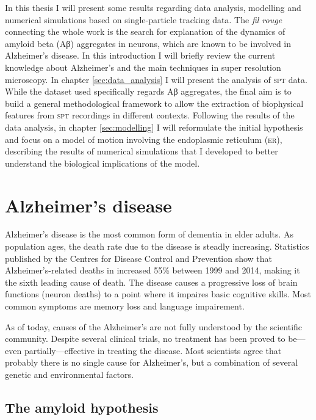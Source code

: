 In this thesis I will present some results regarding data analysis, modelling and numerical simulations based on single-particle tracking data. The \textit{fil rouge} connecting the whole work is the search for explanation of the dynamics of amyloid beta (Aβ) aggregates in neurons, which are known to be involved in Alzheimer's disease. In this introduction I will briefly review the current knowledge about Alzheimer's and the main techniques in super resolution microscopy. In chapter \ref{sec:data_analysis} I will present the analysis of \textsc{spt} data. While the dataset used specifically regards Aβ aggregates, the final aim is to build a general methodological framework to allow the extraction of biophysical features from \textsc{spt} recordings in different contexts. Following the results of the data analysis, in chapter \ref{sec:modelling} I will reformulate the initial hypothesis and focus on a model of motion involving the endoplasmic reticulum (\textsc{er}), describing the results of numerical simulations that I developed to better understand the biological implications of the model.

\section{Alzheimer's disease}\label{sec:alzheimer}

Alzheimer’s disease is the most common form of dementia in elder adults. As population ages, the death rate due to the disease is steadly increasing. Statistics published by the Centres for Disease Control and Prevention show that Alzheimer’s-related deaths in  increased 55\% between 1999 and 2014, making it the sixth leading cause of death. The disease causes a progressive loss of brain functions (neuron deaths) to a point where it impaires basic cognitive skills. Most common symptoms are memory loss and language impairement.

As of today, causes of the Alzheimer’s are not fully understood by the scientific community. Despite several clinical trials, no treatment has been proved to be---even partially---effective in treating the disease. Most scientists agree that probably there is no single cause for Alzheimer’s, but a combination of several genetic and environmental factors.


\subsection{The amyloid hypothesis}

